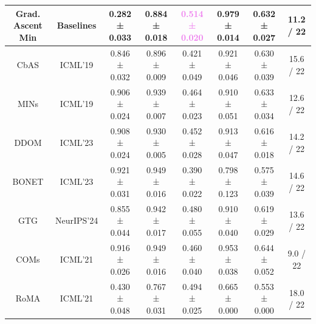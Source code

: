 \begin{table}[t!]
{\begin{tabular}{c|c|ccccc|c}
    Grad. Ascent Min & \multirow{-6}{*}{Baselines}  & 0.282 ± 0.033                              & 0.884 ± 0.018                              & \textbf{\textcolor{violet}{0.514 ± 0.020}} & 0.979 ± 0.014                              & 0.632 ± 0.027                              & 11.2 / 22                             \\ \midrule
    CbAS     & ICML'19         & 0.846 ± 0.032                              & 0.896 ± 0.009                              & 0.421 ± 0.049                              & 0.921 ± 0.046                              & 0.630 ± 0.039                              & 15.6 / 22                             \\
    MINs   & ICML'19           & 0.906 ± 0.024                              & 0.939 ± 0.007                              & 0.464 ± 0.023                              & 0.910 ± 0.051                              & 0.633 ± 0.034                              & 12.6 / 22                             \\
    DDOM   & ICML'23           & 0.908 ± 0.024                              & 0.930 ± 0.005                              & 0.452 ± 0.028                              & 0.913 ± 0.047                              & 0.616 ± 0.018                              & 14.2 / 22                             \\
    BONET   & ICML'23          & 0.921 ± 0.031                              & 0.949 ± 0.016                              & 0.390 ± 0.022                              & 0.798 ± 0.123                              & 0.575 ± 0.039                              & 14.6 / 22                             \\
    GTG   & NeurIPS'24            & 0.855 ± 0.044                              & 0.942 ± 0.017                              & 0.480 ± 0.055                              & 0.910 ± 0.040                              & 0.619 ± 0.029                              & 13.6 / 22                             \\ \midrule
    COMs  & ICML'21            & 0.916 ± 0.026                              & 0.949 ± 0.016                              & 0.460 ± 0.040                              & 0.953 ± 0.038                              & 0.644 ± 0.052                              & 9.0 / 22                              \\
    RoMA   & ICML'21           & 0.430 ± 0.048                              & 0.767 ± 0.031                              & 0.494 ± 0.025                              & 0.665 ± 0.000                              & 0.553 ± 0.000                              & 18.0 / 22                             \\

\end{tabular}}
\end{table}
